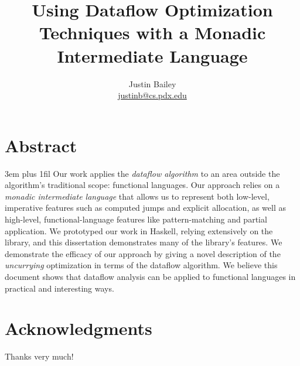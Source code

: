 \dodocclass



\date{}
\author{Justin Bailey \\ \url{justinb@cs.pdx.edu}}
\title{Using Dataflow Optimization Techniques with a Monadic Intermediate Language}
\maketitle 

\pagestyle{plain}
\section*{Abstract}
{%
\parfillskip 3em plus 1fil%
Our work applies the \emph{dataflow algorithm} to an area outside the
algorithm's traditional scope: functional languages. Our approach
relies on a \emph{monadic intermediate language} that allows us to
represent both low-level, imperative features such as computed jumps
and explicit allocation, as well as high-level, functional-language
features like pattern-matching and partial application. We prototyped
our work in Haskell, relying extensively on the \hoopl library, and
this dissertation demonstrates many of the library's features. We
demonstrate the efficacy of our approach by giving a novel description
of the \emph{uncurrying} optimization in terms of the dataflow
algorithm. We believe this document shows that dataflow analysis can
be applied to functional languages in practical and interesting
ways.\par}
\newpage

\section*{Acknowledgments}
Thanks very much!
\newpage

\singlespacing
\tableofcontents
\newpage
{}
\listoffigures
\newpage

